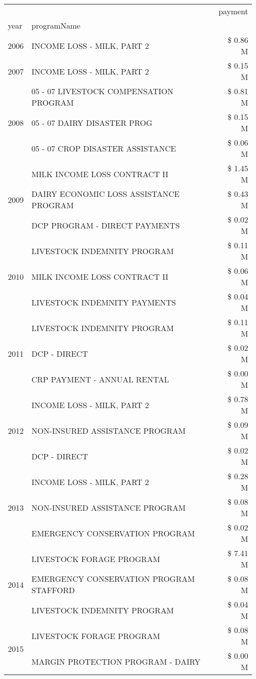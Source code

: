 \begin{tabular}{llr}
\toprule
 &  & payment \\
year & programName &  \\
\midrule
2006 & INCOME LOSS - MILK, PART 2 & \$ 0.86 M \\
\cline{1-3}
2007 & INCOME LOSS - MILK, PART 2 & \$ 0.15 M \\
\cline{1-3}
\multirow[t]{3}{*}{2008} & 05 - 07 LIVESTOCK COMPENSATION PROGRAM & \$ 0.81 M \\
 & 05 - 07 DAIRY DISASTER PROG & \$ 0.15 M \\
 & 05 - 07 CROP DISASTER ASSISTANCE & \$ 0.06 M \\
\cline{1-3}
\multirow[t]{3}{*}{2009} & MILK INCOME LOSS CONTRACT II & \$ 1.45 M \\
 & DAIRY ECONOMIC LOSS ASSISTANCE PROGRAM & \$ 0.43 M \\
 & DCP PROGRAM - DIRECT PAYMENTS & \$ 0.02 M \\
\cline{1-3}
\multirow[t]{3}{*}{2010} & LIVESTOCK INDEMNITY PROGRAM & \$ 0.11 M \\
 & MILK INCOME LOSS CONTRACT II & \$ 0.06 M \\
 & LIVESTOCK INDEMNITY PAYMENTS & \$ 0.04 M \\
\cline{1-3}
\multirow[t]{3}{*}{2011} & LIVESTOCK INDEMNITY PROGRAM & \$ 0.11 M \\
 & DCP - DIRECT & \$ 0.02 M \\
 & CRP PAYMENT - ANNUAL RENTAL & \$ 0.00 M \\
\cline{1-3}
\multirow[t]{3}{*}{2012} & INCOME LOSS - MILK, PART 2 & \$ 0.78 M \\
 & NON-INSURED ASSISTANCE PROGRAM & \$ 0.09 M \\
 & DCP - DIRECT & \$ 0.02 M \\
\cline{1-3}
\multirow[t]{3}{*}{2013} & INCOME LOSS - MILK, PART 2 & \$ 0.28 M \\
 & NON-INSURED ASSISTANCE PROGRAM & \$ 0.08 M \\
 & EMERGENCY CONSERVATION PROGRAM & \$ 0.02 M \\
\cline{1-3}
\multirow[t]{3}{*}{2014} & LIVESTOCK FORAGE PROGRAM & \$ 7.41 M \\
 & EMERGENCY CONSERVATION PROGRAM STAFFORD & \$ 0.08 M \\
 & LIVESTOCK INDEMNITY PROGRAM & \$ 0.04 M \\
\cline{1-3}
\multirow[t]{3}{*}{2015} & LIVESTOCK FORAGE PROGRAM & \$ 0.08 M \\
 & MARGIN PROTECTION PROGRAM - DAIRY & \$ 0.00 M \\

\end{tabular}
